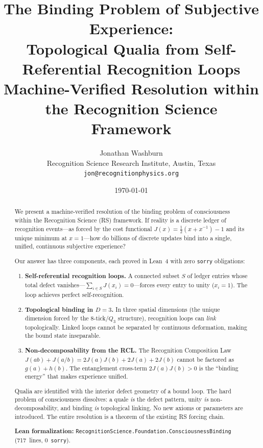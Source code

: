 \documentclass[11pt,a4paper]{article}
\title{\textbf{The Binding Problem of Subjective Experience:\\
Topological Qualia from Self-Referential Recognition Loops}\\[0.5em]
\large Machine-Verified Resolution within the Recognition Science Framework}
\author{Jonathan Washburn\\
\small Recognition Science Research Institute, Austin, Texas\\
\small \texttt{jon@recognitionphysics.org}}
\date{\today}
\theoremstyle{plain}
\theoremstyle{definition}
\theoremstyle{remark}
\newcommand{\Jcost}{J}
\begin{document}
\maketitle

\begin{abstract}
We present a machine-verified resolution of the binding problem of
consciousness within the Recognition Science (RS) framework.  If
reality is a discrete ledger of recognition events---as forced by
the cost functional $\Jcost(x) = \tfrac{1}{2}(x + x^{-1}) - 1$ and
its unique minimum at $x = 1$---how do billions of discrete updates
bind into a single, unified, continuous subjective experience?

Our answer has three components, each proved in Lean~4 with zero
\texttt{sorry} obligations:
\begin{enumerate}[nosep]
\item \textbf{Self-referential recognition loops.}  A connected subset
  $S$ of ledger entries whose total defect vanishes---$\sum_{i \in S}
  \Jcost(x_i) = 0$---forces every entry to unity ($x_i = 1$).  The
  loop achieves perfect self-recognition.
\item \textbf{Topological binding in $D = 3$.}  In three spatial
  dimensions (the unique dimension forced by the 8-tick/$Q_3$
  structure), recognition loops can \emph{link} topologically.
  Linked loops cannot be separated by continuous deformation, making
  the bound state inseparable.
\item \textbf{Non-decomposability from the RCL.}  The Recognition
  Composition Law $\Jcost(ab) + \Jcost(a/b) = 2\Jcost(a)\Jcost(b)
  + 2\Jcost(a) + 2\Jcost(b)$ cannot be factored as $g(a) + h(b)$.
  The entanglement cross-term $2\Jcost(a)\Jcost(b) > 0$ is the
  ``binding energy'' that makes experience unified.
\end{enumerate}

Qualia are identified with the interior defect geometry of a bound
loop.  The hard problem of consciousness dissolves: a quale \emph{is}
the defect pattern, unity \emph{is} non-decomposability, and binding
\emph{is} topological linking.  No new axioms or parameters are
introduced.  The entire resolution is a theorem of the existing RS
forcing chain.

\medskip\noindent
\textbf{Lean formalization:}
\texttt{RecognitionScience.Foundation.ConsciousnessBinding}
(717~lines, 0~\texttt{sorry}).
\end{abstract}

\tableofcontents
\newpage
\end{document}

